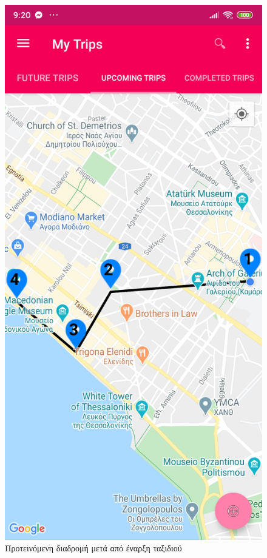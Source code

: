 \documentclass[oneside, 12pt]{book}
\begin{document}
\begin{figure}[H]
    \centering
    \includegraphics[scale=0.15]{images/shortest_places_dataset.jpg}
    \caption{Προτεινόμενη διαδρομή μετά από έναρξη ταξιδιού}
    \label{fig:shortest_path_dataset}
\end{figure}
\end{document}
